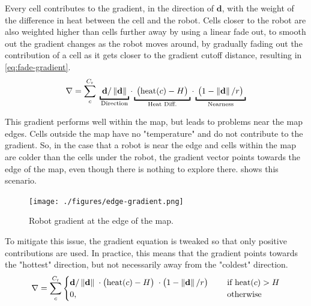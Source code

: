 Every cell contributes to the gradient, in the direction of $\mathbf{d}$, with the weight of the difference in heat between the cell and the robot. Cells closer to the robot are also weighted higher than cells further away by using a linear fade out, to smooth out the gradient changes as the robot moves around, by gradually fading out the contribution of a cell as it gets closer to the gradient cutoff distance, resulting in \cref{eq:fade-gradient}.
\begin{equation}
    \nabla = \sum_c^{C_\mathrm{r}} \;
    \underbracket{\; \mathbf{d}/\norm{\mathbf{d}}      \;}_\text{\makebox[0pt]{Direction}} \cdot
    \underbracket{\; \big(\mathrm{heat}(c) - H\big)    \;}_\text{Heat Diff.} \cdot
    \underbracket{\; \big(1 - \norm{\mathbf{d}}/r\big) \;}_\text{Nearness}
    \label{eq:fade-gradient}
\end{equation}

This gradient performs well within the map, but leads to problems near the map edges. Cells outside the map have no "temperature" and do not contribute to the gradient. {\color{red}So}, in the case that a robot is near the edge and cells within the map are colder than the cells under the robot, the gradient vector points towards the edge of the map, even though there is nothing to explore there.  shows this scenario.
\begin{figure}[h]
    \begin{center}
        \texttt{[image: ./figures/edge-gradient.png]}
    \end{center}
    \caption{Robot gradient at the edge of the map.}
    \label{fig:edge-gradient}
\end{figure}

To mitigate this issue, the gradient equation is tweaked so that only positive contributions are used. In practice, this means that the gradient points towards the "hottest" direction, but not necessarily away from the "coldest" direction.
\begin{equation}
\label{eq:robot-gradient}
    \nabla = \sum_c^{C_\mathrm{r}}
    \begin{cases}
        \mathbf{d}/\left\lVert\mathbf{d}\right\rVert      \; \cdot
        \big(\mathrm{heat}(c) - H\big)    \; \cdot
        \big(1 - \left\lVert\mathbf{d}\right\rVert/r\big) \; \quad &\text{if } \mathrm{heat}(c) > H
        \\
        0, \quad &\text{otherwise}
    \end{cases}
\end{equation}

